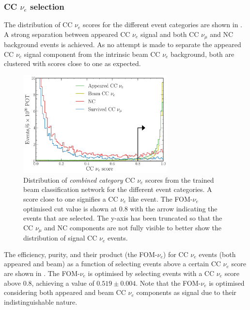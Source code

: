 \subsubsection*{CC $\nu_{e}$ selection} %

The distribution of CC $\nu_{e}$ scores for the different event categories are shown in
. A strong separation between appeared CC $\nu_{e}$ signal
and both CC $\nu_{\mu}$ and NC background events is achieved. As no attempt is made to separate
the appeared CC $\nu_{e}$ signal component from the intrinsic beam CC $\nu_{e}$ background, both
are clustered with scores close to one as expected.

\begin{figure} %
    \includegraphics[width=0.7\textwidth]{diagrams/7-results/final_beam_nuel_outputs.pdf}
    \caption[Distribution of CC $\nu_{e}$ scores from the trained beam classification network]
    {Distribution of \emph{combined category} CC $\nu_{e}$ scores from the trained beam
        classification network for the different event categories. A score close to one signifies
        a CC $\nu_{e}$ like event. The FOM-$\nu_e$ optimised cut value is shown at $0.8$ with the
        arrow indicating the events that are selected. The y-axis has been truncated so that the
        CC $\nu_{\mu}$ and NC components are not fully visible to better show the distribution of
        signal CC $\nu_{e}$ events.}
    \label{fig:final_beam_nuel_outputs}
\end{figure}

The efficiency, purity, and their product (the FOM-$\nu_e$) for CC $\nu_{e}$ events (both appeared
and beam) as a function of selecting events above a certain CC $\nu_{e}$ score are shown in
. The FOM-$\nu_e$ is optimised by selecting events with a CC
$\nu_{e}$ score above $0.8$, achieving a value of $0.519\pm0.004$. Note that the FOM-$\nu_e$ is
optimised considering both appeared and beam CC $\nu_{e}$ components as signal due to their
indistinguishable nature.

